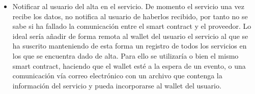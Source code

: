\documentclass[12pt]{report}
\begin{document}
\begin{itemize}
\item Notificar al usuario del alta en el servicio. De momento el servicio una vez recibe los datos, no notifica al usuario de haberlos recibido, por tanto no se sabe si ha fallado la comunicación entre el smart contract y el proveedor. Lo ideal sería añadir de forma remota al wallet del usuario el servicio al que se ha suscrito manteniendo de esta forma un registro de todos los servicios en los que se encuentra dado de alta. Para ello se utilizaría o bien el mismo smart contract, haciendo que el wallet esté a la espera de un evento, o una comunicación vía correo electrónico con un archivo que contenga la información del servicio y pueda incorporarse al wallet del usuario.
\end{itemize}




\printbibliography[
heading=bibintoc,
title={Bibliografía}
]
\end{document}
